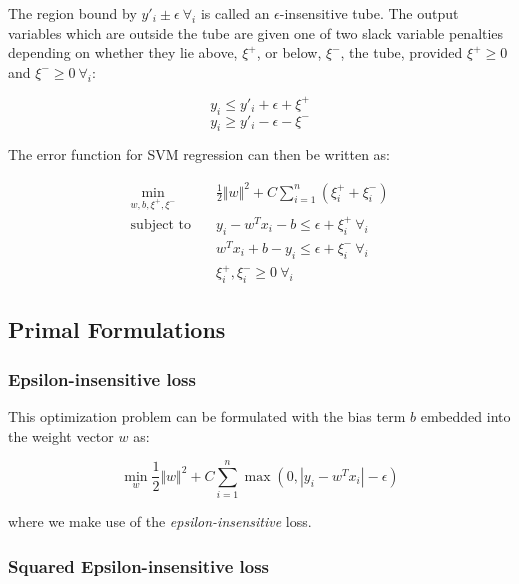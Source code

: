 The region bound by $y'_i\pm\epsilon \ \forall_i$ is called an $\epsilon$-insensitive tube. The output variables which are outside the tube are given one of two slack variable penalties depending on whether they lie above, $\xi^+$, or below, $\xi^-$, the tube, provided $\xi^+ \geq 0$ and $\xi^- \geq 0 \ \forall_i$:

\begin{equation}
    y_i\leq y'_i+\epsilon+\xi^+ \tag{2.4a}
\end{equation}
\begin{equation}
    y_i\geq y'_i-\epsilon-\xi^- \tag{2.4b}
\end{equation}

The error function for SVM regression can then be written as:

\begin{equation}
    \begin{aligned}
        \min_{w,b,\xi^+,\xi^-} \quad & \frac{1}{2}\Vert w\Vert^{2} + C \sum_{i=1}^{n}(\xi_i^+ + \xi_i^-) \\
            \textrm{subject to} \quad & y_i - w^T x_i - b \leq \epsilon + \xi_i^+ \ \forall_i \\ & w^T x_i + b - y_i \leq \epsilon + \xi_i^- \ \forall_i \\ & \xi_i^+, \xi_i^- \geq 0 \ \forall_i
    \end{aligned} \tag{2.5}
\end{equation}

\subsection{Primal Formulations}

\subsubsection{Epsilon-insensitive loss}

This optimization problem can be formulated with the bias term $b$ embedded into the weight vector $w$ as:

\begin{equation}
    \min_ {w} \frac{1}{2} \Vert w\Vert^{2} + C \sum_{i=1}^n \max(0, |y_i - w^T x_i| - \epsilon) \tag{2.6}
\end{equation}

where we make use of the \emph{epsilon-insensitive} loss.

\subsubsection{Squared Epsilon-insensitive loss}

